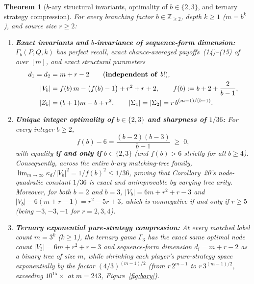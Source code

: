 \documentclass[11pt,a4paper]{article}
\newtheorem{theorem}{Theorem}
\theoremstyle{remark}
\newcommand{\Z}{\mathbb{Z}}
\begin{document}
\begin{theorem}[$b$-ary structural invariants, optimality of $b \in \{2,3\}$, and ternary strategy compression]\label{thm:bary}
For every branching factor $b \in \Z_{\ge 2}$, depth $k \ge 1$ ($m = b^k$), and source size $r \ge 2$:
\begin{enumerate}
  \item[\textup{(a)}] \textbf{Exact invariants and $b$-invariance of sequence-form dimension:} $\Gamma_b(P,Q,k)$ has perfect recall, exact chance-averaged payoffs~\textup{(14)--(15)} of~\cite{CHPS2026} over $[m]$, and exact structural parameters
  \begin{align}
    d_1 = d_2 &= m + r - 2 \qquad (\text{\textbf{independent of }} b!), \label{eq:bary_d} \\
    |V_b| &= f(b)\,m - \bigl(f(b) - 1\bigr) + r^2 + r + 2, \qquad f(b) := b + 2 + \frac{2}{b-1}, \label{eq:bary_V} \\
    |Z_b| &= (b + 1)m - b + r^2, \qquad |\Sigma_1| = |\Sigma_2| = r\,b^{(m-1)/(b-1)}. \label{eq:bary_Z}
  \end{align}
  \item[\textup{(b)}] \textbf{Unique integer optimality of $b \in \{2, 3\}$ and sharpness of $1/36$:} For every integer $b \ge 2$,
  \begin{equation}\label{eq:f_opt}
    f(b) - 6 = \frac{(b - 2)(b - 3)}{b - 1} \;\ge\; 0,
  \end{equation}
  with equality \textbf{if and only if} $b \in \{2, 3\}$ (and $f(b) > 6$ strictly for all $b \ge 4$). Consequently, across the entire $b$-ary matching-tree family, $\lim_{m\to\infty} \kappa_d/|V_b|^2 = 1/f(b)^2 \le 1/36$, proving that Corollary~20's node-quadratic constant $1/36$ is exact and unimprovable by varying tree arity. Moreover, for both $b=2$ and $b=3$, $|V_b| = 6m + r^2 + r - 3$ and $|V_b| - 6(m+r-1) = r^2 - 5r + 3$, which is nonnegative if and only if $r \ge 5$ (being $-3,-3,-1$ for $r=2,3,4$).
  \item[\textup{(c)}] \textbf{Ternary exponential pure-strategy compression:} At every matched label count $m = 3^k$ ($k \ge 1$), the ternary game $\Gamma_3$ has the \emph{exact same} optimal node count $|V_3| = 6m + r^2 + r - 3$ and sequence-form dimension $d_i = m + r - 2$ as a binary tree of size $m$, while shrinking each player's pure-strategy space exponentially by the factor $(4/3)^{(m-1)/2}$ (from $r\,2^{m-1}$ to $r\,3^{(m-1)/2}$, exceeding $10^{15}\times$ at $m=243$, Figure~\ref{fig:bary}).
\end{enumerate}
\end{theorem}
\end{document}
